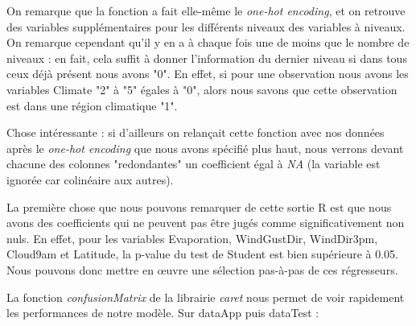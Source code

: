 \documentclass{article}
\begin{document}
On remarque que la fonction a fait elle-même le \emph{one-hot encoding}, et on retrouve des variables supplémentaires pour les différents niveaux des variables à niveaux. On remarque cependant qu'il y en a à chaque fois une de moins que le nombre de niveaux : en fait, cela suffit à donner l'information du dernier niveau si dans tous ceux déjà présent nous avons "0". En effet, si pour une observation nous avons les variables Climate "2" à "5" égales à "0", alors nous savons que cette observation est dans une région climatique "1". 

Chose intéressante : si d'ailleurs on relançait cette fonction avec nos données après le \emph{one-hot encoding} que nous avons spécifié plus haut, nous verrons devant chacune des colonnes "redondantes" un coefficient égal à \emph{NA} (la variable est ignorée car colinéaire aux autres).

La première chose que nous pouvons remarquer de cette sortie R est que nous avons des coefficients qui ne peuvent pas être jugés comme significativement non nuls. En effet, pour les variables Evaporation, WindGustDir, WindDir3pm, Cloud9am et Latitude, la p-value du test de Student est bien supérieure à 0.05. Nous pouvons donc mettre en œuvre une sélection pas-à-pas de ces régresseurs.  

La fonction \emph{confusionMatrix} de la librairie \emph{caret} \cite{caret} nous permet de voir rapidement les performances de notre modèle. Sur dataApp puis dataTest : 
\end{document}
